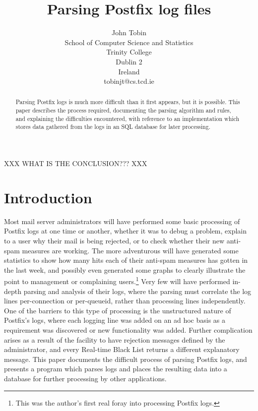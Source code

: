\documentclass[a4paper,12pt,draft]{article}
\begin{document}
\title{Parsing Postfix log files}
\author{John Tobin \\ School of Computer Science and Statistics \\ 
Trinity College \\ Dublin 2 \\ Ireland \\ tobinjt@cs.tcd.ie}
\date{}
\maketitle

\begin{abstract}

    Parsing Postfix logs is much more difficult than it first appears, but
    it is possible.  This paper describes the process required, documenting
    the parsing algorithm and rules, and explaining the difficulties
    encountered, with reference to an implementation which stores data
    gathered from the logs in an SQL database for later processing.

\end{abstract}

XXX WHAT IS THE CONCLUSION??? XXX

\newpage
\tableofcontents

\section{Introduction}

Most mail server administrators will have performed some basic processing
of Postfix logs at one time or another, whether it was to debug a problem,
explain to a user why their mail is being rejected, or to check whether
their new anti-spam measures are working.  The more adventurous will have
generated some statistics to show how many hits each of their anti-spam
measures has gotten in the last week, and possibly even generated some
graphs to clearly illustrate the point to management or complaining
users.\footnote{This was the author's first real foray into processing
Postfix logs.}  Very few will have performed in-depth parsing and analysis
of their logs, where the parsing must correlate the log lines
per-connection or per-queueid, rather than processing lines independently.
One of the barriers to this type of processing is the unstructured nature
of Postfix's logs, where each logging line was added on an ad hoc basis as
a requirement was discovered or new functionality was added.  Further
complication arises as a result of the facility to have rejection messages
defined by the administrator, and every Real-time Black List returns a
different explanatory message.  This paper documents the difficult process
of parsing Postfix logs, and presents a program which parses logs and
places the resulting data into a database for further processing by other
applications.
\end{document}

